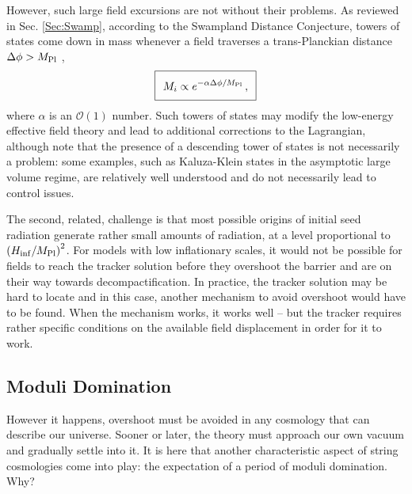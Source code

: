 However, such large field excursions are not without their problems. As reviewed in Sec. \ref{Sec:Swamp}, according to the Swampland Distance Conjecture, towers of states come down in mass whenever a field traverses a trans-Planckian distance $\Delta \phi > M_{\rm Pl}$ \cite{Ooguri:2018wrx},
\begin{equation}
\setlength\fboxsep{0.25cm}
\setlength\fboxrule{0.4pt}
\boxed{
M_i \propto e^{-\alpha \Delta \phi / M_{\rm Pl}}\,,
}
\end{equation}
%
where $\alpha$ is an $\mathcal{O}(1)$ number. Such towers of states may modify the low-energy effective field theory and lead to additional corrections to the Lagrangian, although note that the presence of a descending tower of states is not necessarily a problem: some examples, such as Kaluza-Klein states in the asymptotic large volume regime, are relatively well understood and do not necessarily lead to control issues.

The second, related, challenge is that most possible origins of initial seed radiation generate rather small amounts of radiation, at a level proportional to $\left(H_{\rm inf}/M_{\rm Pl}\right)^2$. For models with low inflationary scales, it would not be possible for fields to reach the tracker solution before they overshoot the barrier and are on their way towards decompactification. In practice, the tracker solution may be hard to locate and in this case, another mechanism to avoid overshoot would have to be found. When the mechanism works, it works well -- but the tracker requires rather specific conditions on the available field displacement in order for it to work.

\subsection{Moduli Domination}

However it happens, overshoot must be avoided in any cosmology that can describe our universe. Sooner or later, the theory must approach our own vacuum and gradually settle into it. It is here that another characteristic aspect of string cosmologies come into play: the expectation of a period of moduli domination. Why?

